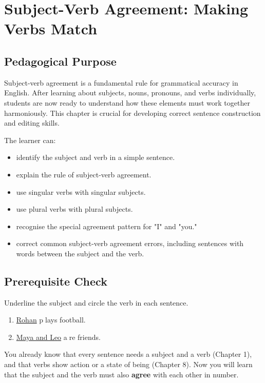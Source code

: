 
\chapter{Subject-Verb Agreement: Making Verbs Match}

\section{Pedagogical Purpose}
Subject-verb agreement is a fundamental rule for grammatical accuracy in English. After learning about subjects, nouns, pronouns, and verbs individually, students are now ready to understand how these elements must work together harmoniously. This chapter is crucial for developing correct sentence construction and editing skills.

\begin{learningobjectives}
The learner can:
\begin{itemize}
    \item identify the subject and verb in a simple sentence.
    \item explain the rule of subject-verb agreement.
    \item use singular verbs with singular subjects.
    \item use plural verbs with plural subjects.
    \item recognise the special agreement pattern for "I" and "you."
    \item correct common subject-verb agreement errors, including sentences with words between the subject and the verb.
\end{itemize}
\end{learningobjectives}

\section{Prerequisite Check}
\begin{quickcheck}
Underline the subject and circle the verb in each sentence.
\begin{enumerate}
    \item \underline{Rohan} \textcircled{plays} football.
    \item \underline{Maya and Leo} \textcircled{are} friends.
\end{enumerate}
\end{quickcheck}

\begin{rememberbox}
You already know that every sentence needs a subject and a verb (Chapter 1), and that verbs show action or a state of being (Chapter 8). Now you will learn that the subject and the verb must also \textbf{agree} with each other in number.
\end{rememberbox}

